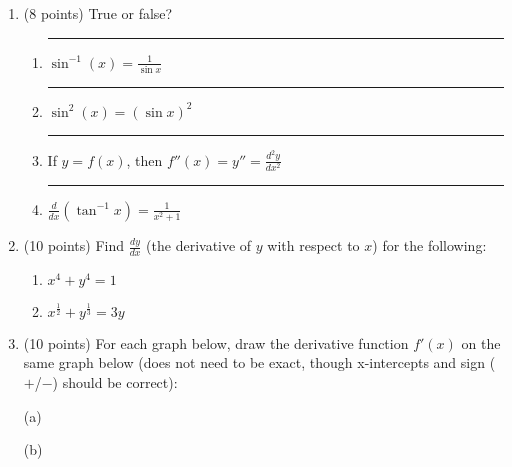\documentclass[11pt]{article}
\begin{document}
\begin{enumerate}[itemsep=30pt]
\begin{flushright}\noindent\rule{4cm}{0.4pt}\end{flushright}

\item (8 points) True or false?
\begin{enumerate}[itemsep=30pt]
    \item \rule{1cm}{0.4pt} $\sin^{-1}(x) = \frac{1}{\sin{x}}$
    \item \rule{1cm}{0.4pt} $\sin^{2}(x) = (\sin{x})^2$
    \item \rule{1cm}{0.4pt} If $y=f(x)$, then $f''(x) = y'' = \frac{d^2y}{dx^2}$
    \item \rule{1cm}{0.4pt} $\frac{d}{dx} \left( \tan^{-1} x \right) = \frac{1}{x^2 + 1}$
\end{enumerate}

\newpage

\item (10 points) Find $\frac{dy}{dx}$ (the derivative of $y$ with respect to $x$) for the following:
\begin{enumerate}[itemsep=70pt]
    \item $x^4 + y^4 = 1$
    \item $x^{\frac{1}{2}} + y^{\frac{1}{3}} = 3y$
\end{enumerate}

\vspace{30pt}

\item (10 points) For each graph below, draw the derivative function $f'(x)$ on the same graph below (does not need to be exact, though x-intercepts and sign ($+$/$-$) should be correct):

\vspace{10pt}
\hspace{50pt}(a)
\begin{center}
\end{center}

\vspace{10pt}
\hspace{50pt}(b)
\begin{center}
\end{center}

\end{enumerate}
\end{document}
